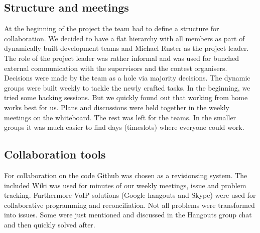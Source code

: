 \subsection{Structure and meetings}
At the beginning of the project the team had to define a structure for collaboration. We decided to have a flat hierarchy with all members as part of dynamically built development teams and Michael Ruster as the project leader. The role of the project leader was rather informal and was used for bunched external communication with the supervisors and the contest organisers. Decisions were made by the team as a hole via majority decisions. The dynamic groups were built weekly to tackle the newly crafted tasks. In the beginning, we tried some hacking sessions. But we quickly found out that working from home works best for us. Plans and discussions were held together in the weekly meetings on the whiteboard. The rest was left for the teams. In the smaller groups it was much easier to find days (timeslots) where everyone could work.
\subsection{Collaboration tools}
For collaboration on the code Github was chosen as a revisionsing system. The included Wiki was used for minutes of our weekly meetings, issue and problem tracking. Furthermore VoIP-solutions (Google hangouts and Skype) were used for collaborative programming and reconciliation. Not all problems were transformed into issues. Some were just mentioned and discussed in the Hangouts group chat and then quickly solved after.

